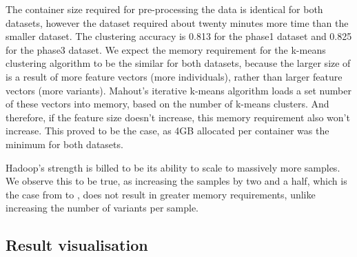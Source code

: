 \documentclass{bioinfo}
\begin{document}
The container size required for pre-processing the data is identical for both datasets, however the \ThreePhasethree{} dataset required about twenty minutes more time than the smaller \SevenPhaseone{} dataset.
The clustering accuracy is 0.813 for the phase1 dataset and 0.825 for the phase3 dataset.
We expect the memory requirement for the k-means clustering algorithm to be the similar for both datasets, because the larger size of \SevenPhaseone{} is a result of more feature vectors (more individuals), rather than larger feature vectors (more variants).
Mahout's iterative k-means algorithm loads a set number of these vectors into memory, based on the number of k-means clusters. And therefore, if the feature size doesn't increase, this memory requirement also won't increase.
This proved to be the case, as 4GB allocated per container was the minimum for both datasets.

Hadoop's strength is billed to be its ability to scale to massively more samples. We observe this to be true, as increasing the samples by two and a half, which is the case from \SevenPhaseone{} to \ThreePhasethree{}, does not result in greater memory requirements,
unlike increasing the number of variants per sample.

\subsection*{Result visualisation}
\end{document}
